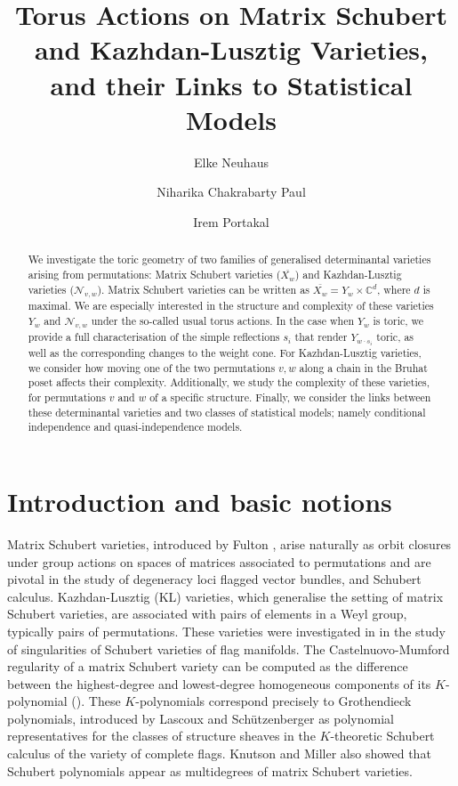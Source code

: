 \documentclass[11pt]{amsart}
\author[\tiny Elke Neuhaus]{Elke Neuhaus}
\author[\tiny Niharika Chakrabarty Paul]{Niharika Chakrabarty Paul}
\author[\tiny Irem Portakal]{Irem Portakal}
\theoremstyle{definition}
\theoremstyle{definition}
\theoremstyle{definition}
\theoremstyle{definition}
\newcommand{\Nvw}{\mathcal{N}_{v,w}}
\begin{document}
\title[\tiny Torus Actions on Matrix Schubert and Kazhdan-Lusztig Varieties,
and their Links to Statistical Models]{Torus Actions on Matrix Schubert and Kazhdan-Lusztig Varieties,\\
and their Links to Statistical Models}



\begin{abstract}
We investigate the toric geometry of two families of generalised determinantal varieties arising from permutations: Matrix Schubert varieties ($\overline{X_w}$) and Kazhdan-Lusztig varieties ($\Nvw$). Matrix Schubert varieties can be written as $\overline{X_w} = Y_w \times \mathbb C^d$, where $d$ is maximal. 
We are especially interested in the structure 
and complexity of these varieties $Y_w$ and $\Nvw$ under the so-called usual torus actions. 
In the case when $Y_w$ is toric, we provide a full characterisation of the simple reflections $s_i$ that render ${Y_{w \cdot s_i}}$ toric, as well as the corresponding changes to the weight cone.
For Kazhdan-Lusztig varieties, we consider how moving one of the two permutations $v,w$ along a chain in the Bruhat poset affects their complexity. 
Additionally, we study the complexity of these varieties, for permutations $v$ and $w$ of a specific structure.
Finally, we consider the links between these determinantal varieties and two classes of statistical models; namely conditional independence and quasi-independence models.
\end{abstract}



\maketitle

\section{Introduction and basic notions}
Matrix Schubert varieties, introduced by Fulton \cite{fulton1992flags}, arise naturally as orbit closures under group actions on spaces of matrices associated to permutations and are pivotal in the study of degeneracy loci flagged vector bundles, and Schubert calculus.  Kazhdan-Lusztig (KL) varieties, which generalise the setting of matrix Schubert varieties, are associated with pairs of elements in a Weyl group, typically pairs of permutations. These varieties were investigated in \cite{woo2008governing} in the study of singularities of Schubert varieties of flag manifolds. The Castelnuovo-Mumford regularity of a matrix Schubert variety can be computed as the difference between the highest-degree and lowest-degree homogeneous components of its $K$-polynomial (\cite{rajchgot2021degrees}). These $K$-polynomials correspond precisely to Grothendieck polynomials, introduced by Lascoux and Schützenberger \cite{lascoux1982structure} as polynomial representatives for the classes of structure sheaves in the $K$-theoretic Schubert calculus of the variety of complete flags. Knutson and Miller \cite{knutson2005geometry} also showed that Schubert polynomials appear as multidegrees of matrix Schubert varieties.
\end{document}
